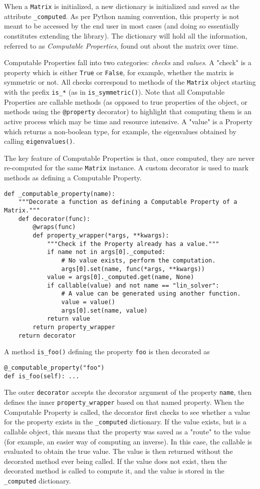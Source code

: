 \documentclass[12pt,a4paper]{article}
\newcommand{\ct}[1]{\texttt{#1}}
\begin{document}
When a \ct{Matrix} is initialized, a new dictionary is initialized and saved as the attribute \ct{\_computed}. As per Python naming convention, this property is not meant to be accessed by the end user in most cases (and doing so essentially constitutes extending the library). The dictionary will hold all the information, referred to as \textit{Computable Properties}, found out about the matrix over time. 

Computable Properties fall into two categories: \textit{checks} and \textit{values}. A "check" is a property which is either \ct{True} or \ct{False}, for example, whether the matrix is symmetric or not. All checks correspond to methods of the \ct{Matrix} object starting with the prefix \ct{is\_*} (as in \ct{is\_symmetric()}). Note that all Computable Properties are callable methods (as opposed to true properties of the object, or methods using the \ct{@property} decorator) to highlight that computing them is an active process which may be time and resource intensive. A "value" is a Property which returns a non-boolean type, for example, the eigenvalues obtained by calling \ct{eigenvalues()}.

The key feature of Computable Properties is that, once computed, they are never re-computed for the same \ct{Matrix} instance. A custom decorator is used to mark methods as defining a Computable Property.
\begin{verbatim}
def _computable_property(name):
    """Decorate a function as defining a Computable Property of a Matrix."""
    def decorator(func):
        @wraps(func)
        def property_wrapper(*args, **kwargs):
            """Check if the Property already has a value."""
            if name not in args[0]._computed:
                # No value exists, perform the computation.
                args[0].set(name, func(*args, **kwargs))
            value = args[0]._computed.get(name, None)
            if callable(value) and not name == "lin_solver":
                # A value can be generated using another function.
                value = value()
                args[0].set(name, value)
            return value
        return property_wrapper
    return decorator
\end{verbatim}
A method \ct{is\_foo()} defining the property \ct{foo} is then decorated as
\begin{verbatim}
@_computable_property("foo")
def is_foo(self): ...
\end{verbatim}
The outer \ct{decorator} accepts the decorator argument of the property \ct{name}, then defines the inner \ct{property\_wrapper} based on that named property. When the Computable Property is called, the decorator first checks to see whether a value for the property exists in the \ct{\_computed} dictionary. If the value exists, but is a callable object, this means that the property was saved as a "route" to the value (for example, an easier way of computing an inverse). In this case, the callable is evaluated to obtain the true value. The value is then returned without the decorated method ever being called. If the value does not exist, then the decorated method is called to compute it, and the value is stored in the \ct{\_computed} dictionary.
\end{document}
